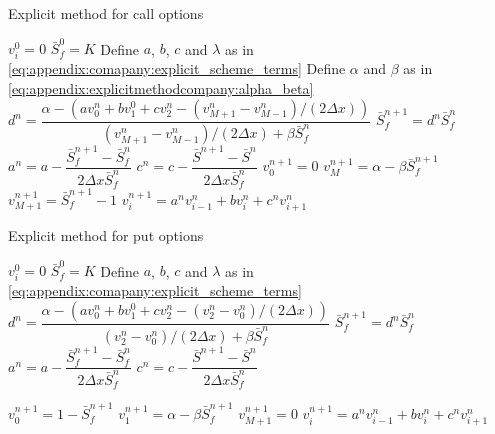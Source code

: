 \begin{algorithm}[H]
    \caption{Explicit method for call options}\label{alg:appendix:companytransformation:explicits:call_explicit_method_algorithm}
    \begin{algorithmic}
      \State $v^{0}_i = 0 $
    \EndFor
    \State $\bar{S}_{f}^{0} = K$
    \State Define $a$, $b$, $c$ and $\lambda$ as in \eqref{eq:appendix:comapany:explicit_scheme_terms}
    \State Define $\alpha$ and $\beta$ as in \eqref{eq:appendix:explicitmethodcompany:alpha_beta}
      \State $d^n = \dfrac{\alpha - (av^{n}_{0} + bv^{0}_{1} + cv^{n}_{2} - (v^{n}_{M+1} - v^{n}_{M-1})/(2\Delta{x}))}{(v^{n}_{M+1} - v^{n}_{M-1})/(2\Delta{x}) + \beta\bar{S}^{n}_f}$
      \State $\bar{S}^{n+1}_{f}=d^{n}\bar{S}^{n}_{f}$
      \State $a^{n} = a - \dfrac{\bar{S}^{n+1}_{f} - \bar{S}^{n}_{f}}{2\Delta{x}\bar{S}^{n}_{f}}$
      \State $c^{n} = c - \dfrac{\bar{S}^{n+1} - \bar{S}^{n}}{2\Delta{x}\bar{S}^{n}_{f}}$
      \State $v^{n+1}_{0}= 0$
      \State $v^{n+1}_{M}=\alpha - \beta\bar{S}^{n+1}_{f}$
      \State $v^{n+1}_{M+1} =\bar{S}^{n+1}_{f} - 1$
        \State $v^{n+1}_{i} = a^{n} v^{n}_{i-1} + b v^{n}_{i} + c^{n}v^{n}_{i+1}$
      \EndFor
    \EndFor
  \end{algorithmic}
  \end{algorithm}

\begin{algorithm}[H]
    \caption{Explicit method for put options}\label{alg:appendix:companytransformation:explicits:put_explicit_method_algorithm}
    \begin{algorithmic}
      \State $v^{0}_i = 0 $
    \EndFor
    \State $\bar{S}_{f}^{0} = K$
    \State Define $a$, $b$, $c$ and $\lambda$ as in \eqref{eq:appendix:comapany:explicit_scheme_terms}
      \State $d^n = \dfrac{\alpha - (av^{n}_{0} + bv^{0}_{1} + cv^{n}_{2} - (v^{n}_{2} - v^{n}_{0})/(2\Delta{x}))}{(v^{n}_{2} - v^{n}_{0})/(2\Delta{x}) + \beta\bar{S}^{n}_f}$
      \State $\bar{S}^{n+1}_{f}=d^{n}\bar{S}^{n}_{f}$
      \State $a^{n} = a - \dfrac{\bar{S}^{n+1}_{f} - \bar{S}^{n}_{f}}{2\Delta{x}\bar{S}^{n}_{f}}$
      \State $c^{n} = c - \dfrac{\bar{S}^{n+1} - \bar{S}^{n}}{2\Delta{x}\bar{S}^{n}_{f}}$

      \State $v^{n+1}_{0}=1 - \bar{S}^{n+1}_{f}$
      \State $v^{n+1}_{1}=\alpha - \beta\bar{S}^{n+1}_{f}$
      \State $v^{n+1}_{M+1} = 0$
        \State $v^{n+1}_{i} = a^{n} v^{n}_{i-1} + b v^{n}_{i} + c^{n}v^{n}_{i+1}$
      \EndFor
    \EndFor
  \end{algorithmic}
  \end{algorithm}
